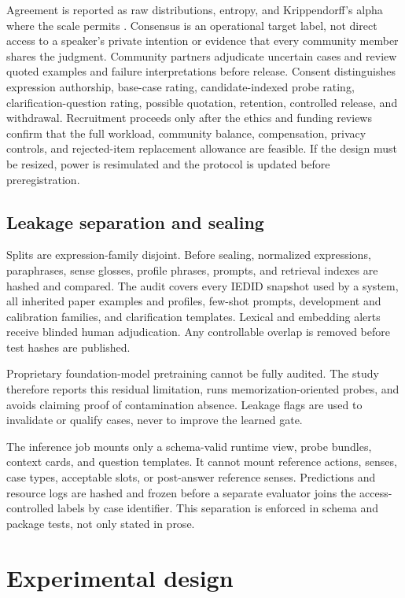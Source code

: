 \documentclass[preprint,12pt,authoryear]{elsarticle}
\begin{document}
Agreement is reported as raw distributions, entropy, and Krippendorff's alpha
where the scale permits \citep{artstein2008intercoder}. Consensus is an
operational target label, not direct access to a speaker's private intention
or evidence that every community member shares the judgment. Community
partners adjudicate uncertain cases and review quoted examples and failure
interpretations before release.
Consent distinguishes expression authorship, base-case rating,
candidate-indexed probe rating, clarification-question rating, possible
quotation, retention, controlled release, and withdrawal. Recruitment proceeds
only after the ethics and funding reviews confirm that the full workload,
community balance, compensation, privacy controls, and rejected-item
replacement allowance are feasible. If the design must be resized, power is
resimulated and the protocol is updated before preregistration.

\subsection{Leakage separation and sealing}

Splits are expression-family disjoint. Before sealing, normalized expressions,
paraphrases, sense glosses, profile phrases, prompts, and retrieval indexes are
hashed and compared. The audit covers every IEDID snapshot used by a system,
all inherited paper examples and profiles, few-shot prompts, development and
calibration families, and clarification templates. Lexical and embedding
alerts receive blinded human adjudication. Any controllable overlap is removed
before test hashes are published.

Proprietary foundation-model pretraining cannot be fully audited. The study
therefore reports this residual limitation, runs memorization-oriented probes,
and avoids claiming proof of contamination absence. Leakage flags are used to
invalidate or qualify cases, never to improve the learned gate.

The inference job mounts only a schema-valid runtime view, probe bundles,
context cards, and question templates. It cannot mount reference actions,
senses, case types, acceptable slots, or post-answer reference senses.
Predictions and resource logs are hashed and frozen before a separate evaluator
joins the access-controlled labels by case identifier. This separation is
enforced in schema and package tests, not only stated in prose.

\section{Experimental design}
\end{document}
